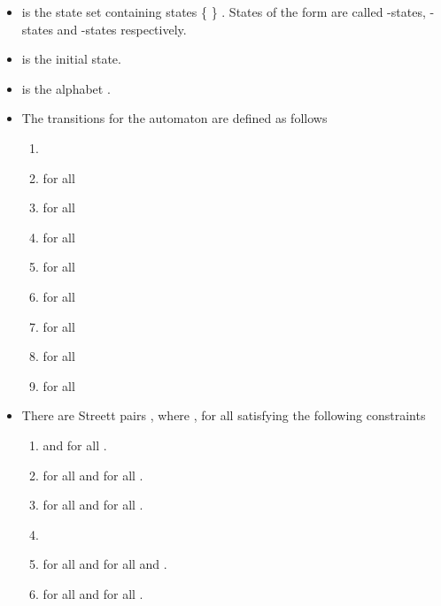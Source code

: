 \documentclass[3p]{elsarticle}
\begin{document}
\begin{itemize}

\item  is the state set containing  states  \{   \} .
States of the form  are called -states,
-states and -states respectively.

\item  is the initial state.

\item  is the alphabet .

\item The transitions for the automaton are defined as follows

\begin{enumerate}

\item \label{ex1} 

\item \label{ex2}  for all 

\item\label{ex3}  for all 



\item \label{ex5} for all 

\item \label{ex6} for all 


\item \label{ex7} for all 

\item \label{ex8} for all 

\item \label{ex9} for all 

\item \label{ex10} for all 


\end{enumerate}

\item There are  Streett pairs , where , for all
 satisfying the following constraints

\begin{enumerate}

\item  and 
 for all .

\item  for all  and for
all .
 
\item  for all  and for
all .

\item  

\item  for all  and 
 for all  and .

\item  for all 
and for all .


\end{enumerate}



\end{itemize}
\end{document}
